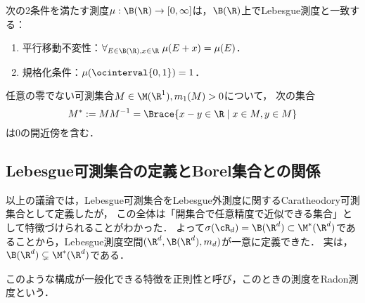 \documentclass[uplatex, dvipdfmx]{jsreport}
\begin{document}
\begin{theorem}
    次の2条件を満たす測度$\mu:\B(\R)\to[0,\infty]$は，$\B(\R)$上でLebesgue測度と一致する：
    \begin{enumerate}
        \item 平行移動不変性：$\forall_{E\in\B(\R),x\in\R}\;\mu(E+x)=\mu(E)$．
        \item 規格化条件：$\mu(\ocinterval{0,1})=1$．
    \end{enumerate}
\end{theorem}

\begin{theorem}[Haar測度としての性質]
    任意の零でない可測集合$M\in\M(\R^1),m_1(M)>0$について，
    次の集合
        \[M^*:=MM^{-1}=\Brace{x-y\in\R\mid x\in M,y\in M}\]
        は$0$の開近傍を含む．
\end{theorem}

\subsection{Lebesgue可測集合の定義とBorel集合との関係}

\begin{tcolorbox}[colframe=ForestGreen, colback=ForestGreen!10!white,breakable,colbacktitle=ForestGreen!40!white,coltitle=black,fonttitle=\bfseries\sffamily,
    title=]
    以上の議論では，Lebesgue可測集合をLebesgue外測度に関するCaratheodory可測集合として定義したが，
    この全体は「開集合で任意精度で近似できる集合」として特徴づけられることがわかった．
    よって$\sigma(\cR_d)=\B(\R^d)\subset\M^*(\R^d)$であることから，Lebesgue測度空間$(\R^d,\B(\R^d),m_d)$が一意に定義できた．
    実は，$\B(\R^d)\subsetneq\M^*(\R^d)$である．

    このような構成が一般化できる特徴を正則性と呼び，このときの測度をRadon測度という．
\end{tcolorbox}
\end{document}
